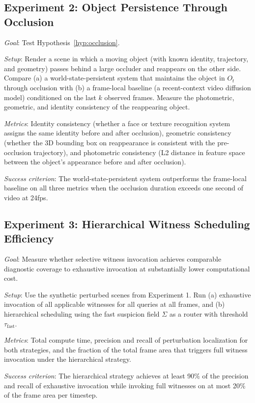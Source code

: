 \documentclass[12pt,a4paper]{article}
\theoremstyle{plain}
\theoremstyle{definition}
\theoremstyle{remark}
\begin{document}
\subsection{Experiment 2: Object Persistence Through Occlusion}

\textit{Goal}: Test Hypothesis~\ref{hyp:occlusion}.

\textit{Setup}: Render a scene in which a moving object (with known identity, trajectory, and geometry) passes behind a large occluder and reappears on the other side. Compare (a) a world-state-persistent system that maintains the object in $O_t$ through occlusion with (b) a frame-local baseline (a recent-context video diffusion model) conditioned on the last $k$ observed frames. Measure the photometric, geometric, and identity consistency of the reappearing object.

\textit{Metrics}: Identity consistency (whether a face or texture recognition system assigns the same identity before and after occlusion), geometric consistency (whether the 3D bounding box on reappearance is consistent with the pre-occlusion trajectory), and photometric consistency (L2 distance in feature space between the object's appearance before and after occlusion).

\textit{Success criterion}: The world-state-persistent system outperforms the frame-local baseline on all three metrics when the occlusion duration exceeds one second of video at 24fps.

\subsection{Experiment 3: Hierarchical Witness Scheduling Efficiency}

\textit{Goal}: Measure whether selective witness invocation achieves comparable diagnostic coverage to exhaustive invocation at substantially lower computational cost.

\textit{Setup}: Use the synthetic perturbed scenes from Experiment 1. Run (a) exhaustive invocation of all applicable witnesses for all queries at all frames, and (b) hierarchical scheduling using the fast suspicion field $\Sigma$ as a router with threshold $\tau_{\mathrm{fast}}$.

\textit{Metrics}: Total compute time, precision and recall of perturbation localization for both strategies, and the fraction of the total frame area that triggers full witness invocation under the hierarchical strategy.

\textit{Success criterion}: The hierarchical strategy achieves at least 90\% of the precision and recall of exhaustive invocation while invoking full witnesses on at most 20\% of the frame area per timestep.
\end{document}
